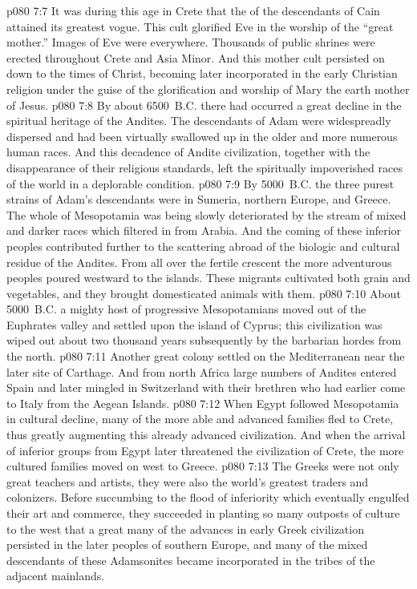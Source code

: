 \vs p080 7:7 It was during this age in Crete that the  of the descendants of Cain attained its greatest vogue. This cult glorified Eve in the worship of the “great mother.” Images of Eve were everywhere. Thousands of public shrines were erected throughout Crete and Asia Minor. And this mother cult persisted on down to the times of Christ, becoming later incorporated in the early Christian religion under the guise of the glorification and worship of Mary the earth mother of Jesus.
\pc \vs p080 7:8 By about 6500~B.C. there had occurred a great decline in the spiritual heritage of the Andites. The descendants of Adam were widespreadly dispersed and had been virtually swallowed up in the older and more numerous human races. And this decadence of Andite civilization, together with the disappearance of their religious standards, left the spiritually impoverished races of the world in a deplorable condition.
\pc \vs p080 7:9 By 5000~B.C. the three purest strains of Adam’s descendants were in Sumeria, northern Europe, and Greece. The whole of Mesopotamia was being slowly deteriorated by the stream of mixed and darker races which filtered in from Arabia. And the coming of these inferior peoples contributed further to the scattering abroad of the biologic and cultural residue of the Andites. From all over the fertile crescent the more adventurous peoples poured westward to the islands. These migrants cultivated both grain and vegetables, and they brought domesticated animals with them.
\vs p080 7:10 About 5000~B.C. a mighty host of progressive Mesopotamians moved out of the Euphrates valley and settled upon the island of Cyprus; this civilization was wiped out about two thousand years subsequently by the barbarian hordes from the north.\plusone
\pc \vs p080 7:11 Another great colony settled on the Mediterranean near the later site of Carthage. And from north Africa large numbers of Andites entered Spain and later mingled in Switzerland with their brethren who had earlier come to Italy from the Aegean Islands.
\pc \vs p080 7:12 When Egypt followed Mesopotamia in cultural decline, many of the more able and advanced families fled to Crete, thus greatly augmenting this already advanced civilization. And when the arrival of inferior groups from Egypt later threatened the civilization of Crete, the more cultured families moved on west to Greece.
\pc \vs p080 7:13 The Greeks were not only great teachers and artists, they were also the world’s greatest traders and colonizers. Before succumbing to the flood of inferiority which eventually engulfed their art and commerce, they succeeded in planting so many outposts of culture to the west that a great many of the advances in early Greek civilization persisted in the later peoples of southern Europe, and many of the mixed descendants of these Adamsonites became incorporated in the tribes of the adjacent mainlands.
